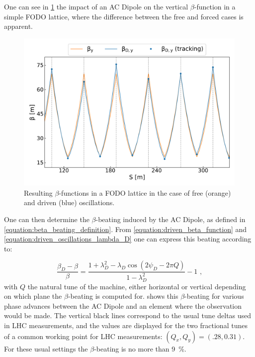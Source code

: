 One can see in \cref{figure:acdipole_beta_functions_vs_nominal} the impact of an AC Dipole on the vertical \(\beta\)-function in a simple FODO lattice, where the difference between the free and forced cases is apparent.

\begin{figure}[!htb]
  \centering
  \includegraphics*[width=0.99\linewidth]{Figures/Optics_Measurements_Corrections_at_LHC/betas_nominal_vs_driven.pdf}
  \caption{Resulting \(\beta\)-functions in a FODO lattice in the case of free (\textcolor{mplorange}{orange}) and driven (\textcolor{mplblue}{blue}) oscillations.}
  \label{figure:acdipole_beta_functions_vs_nominal}
\end{figure}

One can then determine the \(\beta\)-beating induced by the AC Dipole, as defined in \cref{equation:beta_beating_definition}.
From \cref{equation:driven_beta_function} and \cref{equation:driven_oscillations_lambda_D} one can express this beating according to:

\begin{equation}
  \frac{\beta_D - \beta}{\beta} = \frac{1 + \lambda_D^2 - \lambda_D \cos \left(2 \psi_D - 2 \pi Q\right)}{1 - \lambda_D^2} - 1 \text{ ,}
  \label{equation:ac_dipole_beta_beating}
\end{equation}
with \(Q\) the natural tune of the machine, either horizontal or vertical depending on which plane the \(\beta\)-beating is computed for.
 shows this \(\beta\)-beating for various phase advances between the AC Dipole and an element where the observation would be made.
The vertical black lines correspond to the usual tune deltas used in LHC measurements, and the values are displayed for the two fractional tunes of a common working point for LHC measurements: \((Q_x, Q_y) = (.28, 0.31)\).
For these usual settings the \(\beta\)-beating is no more than \qty{9}{\percent}.

